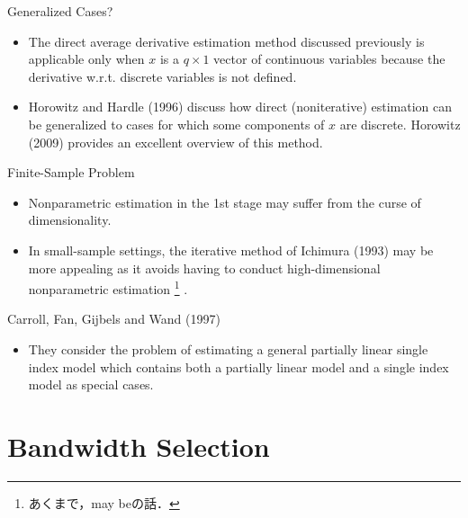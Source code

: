 \documentclass[xcolor=svgnames,dvipdfmx,cjk]{beamer}
\theoremstyle{example}
\begin{document}
\begin{frame}{Generalized Cases?}
\begin{itemize}
  \item The direct average derivative estimation method discussed previously
        is applicable only when $x$ is a $q \times 1$ vector of continuous variables
        because the derivative w.r.t. discrete variables is not defined.
  \item Horowitz and Hardle (1996) discuss how direct (noniterative) estimation can be generalized to cases
        for which some components of $x$ are discrete.
        Horowitz (2009) provides an excellent overview of this method. 
\end{itemize}
\end{frame}

\begin{frame}{Finite-Sample Problem}
\begin{itemize}
  \item Nonparametric estimation in the 1st stage may suffer from the curse of dimensionality.
  \item In small-sample settings, the iterative method of Ichimura (1993) may be more appealing 
        as it avoids having to conduct high-dimensional nonparametric estimation
        \footnote{あくまで，may beの話．}
        .
\end{itemize}
\end{frame}

\begin{frame}{Carroll, Fan, Gijbels and Wand (1997)}
\begin{itemize}
  \item They consider the problem of estimating a general partially linear single index model 
        which contains both a partially linear model and a single index model as special cases.
\end{itemize}
\end{frame}


\section{Bandwidth Selection}
  
\end{document}
